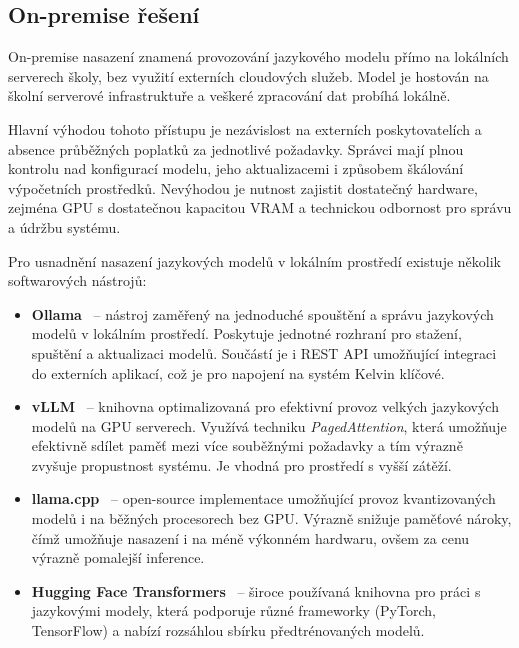 \subsection{On-premise řešení}
\label{subsec:deployment-on-premise}

On-premise nasazení znamená provozování jazykového modelu přímo na lokálních serverech školy, bez využití externích cloudových služeb.
Model je hostován na školní serverové infrastruktuře a veškeré zpracování dat probíhá lokálně.

Hlavní výhodou tohoto přístupu je nezávislost na externích poskytovatelích a absence průběžných poplatků za jednotlivé požadavky.
Správci mají plnou kontrolu nad konfigurací modelu, jeho aktualizacemi i způsobem škálování výpočetních prostředků.
Nevýhodou je nutnost zajistit dostatečný hardware, zejména GPU s dostatečnou kapacitou VRAM a technickou odbornost pro správu a údržbu systému.

Pro usnadnění nasazení jazykových modelů v lokálním prostředí existuje několik softwarových nástrojů:

\begin{itemize}
    \item \textbf{Ollama}~\cite{ollama} -- nástroj zaměřený na jednoduché spouštění a správu jazykových modelů v lokálním prostředí.
    Poskytuje jednotné rozhraní pro stažení, spuštění a aktualizaci modelů.
    Součástí je i REST API umožňující integraci do externích aplikací, což je pro napojení na systém Kelvin klíčové.

    \item \textbf{vLLM}~\cite{vllm} -- knihovna optimalizovaná pro efektivní provoz velkých jazykových modelů na GPU serverech.
    Využívá techniku \textit{PagedAttention}, která umožňuje efektivně sdílet paměť mezi více souběžnými požadavky a tím výrazně zvyšuje propustnost systému.
    Je vhodná pro prostředí s vyšší zátěží.

    \item \textbf{llama.cpp}~\cite{llamacpp} -- open-source implementace umožňující provoz kvantizovaných modelů i na běžných procesorech bez GPU\@.
    Výrazně snižuje paměťové nároky, čímž umožňuje nasazení i na méně výkonném hardwaru, ovšem za cenu výrazně pomalejší inference.

    \item \textbf{Hugging Face Transformers}~\cite{huggingface-transformers} -- široce používaná knihovna pro práci s jazykovými modely, která podporuje různé frameworky (PyTorch, TensorFlow) a nabízí rozsáhlou sbírku předtrénovaných modelů.
\end{itemize}


